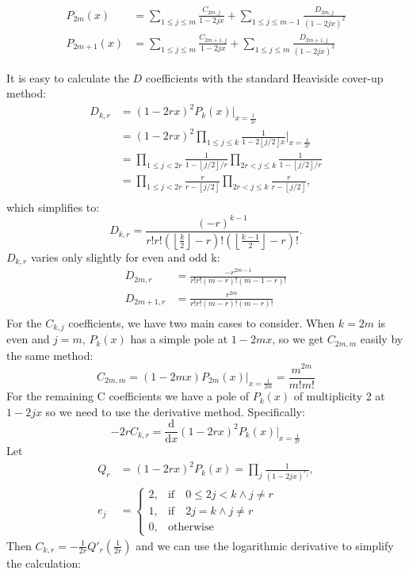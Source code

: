 \documentclass{article}
\newcommand{\floor}[1]{\left\lfloor #1 \right\rfloor}
\begin{document}
\begin{equation}\label{pkx}
    \begin{aligned}
    P_{2m}(x) &= \sum_{1 \leq j \leq m} \frac{C_{2m,j}}{1-2jx} + \sum_{1 \leq j \leq m-1} \frac{D_{2m,j}}{(1-2jx)^2} \\
    P_{2m+1}(x) &= \sum_{1 \leq j \leq m} \frac{C_{2m+1,j}}{1-2jx} + \sum_{1 \leq j \leq m} \frac{D_{2m+1,j}}{(1-2jx)^2}
    \end{aligned}
\end{equation}

It is easy to calculate the $D$ coefficients with the standard Heaviside cover-up method:
$$
\begin{aligned}
    D_{k,r} &= (1-2rx)^2P_k(x)|_{x=\frac{1}{2r}} \\
    &= (1-2rx)^2 \prod_{1 \leq j \leq k} \frac{1}{1-2 \floor{j/2}x} \bigg|_{x=\frac{1}{2r}} \\
    &= \prod_{1 \leq j < 2r} \frac{1}{1-\floor{j/2}/r} \prod_{2r < j \leq k} \frac{1}{1- \floor{j/2}/r} \\
    &= \prod_{1 \leq j < 2r} \frac{r}{r-\floor{j/2}} \prod_{2r < j \leq k} \frac{r}{r- \floor{j/2}}, \\
\end{aligned}
$$
which simplifies to:
\begin{equation}\label{d-k-r}
        D_{k,r}=\frac{(-r)^{k-1}}{r!r!(\floor{\frac{k}{2}}-r)!(\floor{\frac{k-1}{2}}-r)!}.
\end{equation}
$D_{k,r}$ varies only slightly for even and odd k:
$$
\begin{aligned}
    D_{2m,r} &= \frac{-r^{2m-1}}{r!r!(m-r)!(m-1-r)!} \\
    D_{2m+1,r} &= \frac{r^{2m}}{r!r!(m-r)!(m-r)!} \\
\end{aligned}
$$
For the $C_{k,j}$ coefficients, we have two main cases to consider. When $k=2m$ is even and $j=m$, $P_k(x)$ has a simple pole at $1-2mx$, so we get $C_{2m,m}$ easily by the same method:
\begin{equation}\label{c-2m-m}
    C_{2m,m} = (1-2mx)P_{2m}(x)|_{x=\frac{1}{2m}} = \frac{m^{2m}}{m!m!}
\end{equation}
For the remaining C coefficients  we have a pole of $P_k(x)$ of multiplicity 2 at $1-2jx$ so we need to use the derivative method. Specifically:
$$
-2r C_{k,r} = \frac{\mathrm{d}}{\mathrm{d}x} (1-2rx)^2P_k(x)\bigg|_{x=\frac{1}{2r}}
$$
Let 
$$
\begin{aligned}
Q_r &= (1-2rx)^2 P_k(x) = \prod_{j} \frac{1}{(1-2jx)^{e_j}},\\
e_j &= 
    \begin{cases} 
    2,& \mathrm{if}\quad 0 \leq 2j < k \land  j \neq r \\ 
    1, & \mathrm{if} \quad 2j = k \land j \neq r \\
    0, & \mathrm{otherwise}
    \end{cases}
\end{aligned}
$$
Then $C_{k,r} = -\frac{1}{2r}Q'_r\left (\frac{1}{2r} \right)$ and we can use the logarithmic derivative to simplify the calculation:
\end{document}
